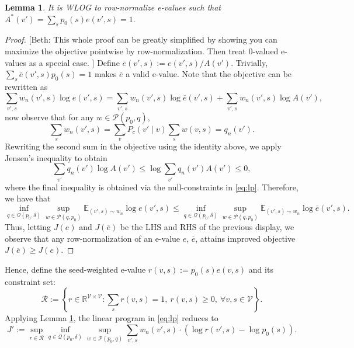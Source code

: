\documentclass[12pt]{article}
\theoremstyle{plain}
\newtheorem{lemma}[theorem]{Lemma}
\theoremstyle{definition}
\newcommand{\emp}[1]{{\color{purple} [Beth: #1]}}
\begin{document}
\begin{lemma}\label{lem:row-normalized}
    It is WLOG to row-normalize e-values such that $A^*(v') = \sum_sp_0(s)e(v',s) = 1.$
\end{lemma}
\begin{proof}

\emp{This whole proof can be greatly simplified by showing you can maximize the objective pointwise by row-normalization. Then treat 0-valued e-values as a special case. }
    Define $\overline{e}(v',s) := e(v',s)/A(v')$. Trivially, $\sum_s\overline{e}(v',s)p_0(s) = 1$ makes $\overline{e}$ a valid e-value. Note that the objective can be rewritten as 
\[\sum_{v',s}w_n(v',s)\log e(v',s) = \sum_{v',s}w_n(v',s)\log \overline{e}(v',s) + \sum_{v',s}w_n(v',s)\log A(v'),\]
now observe that for any $w \in \mathcal{P}(p_0, q)$,
\[\sum_{s}w_n(v',s) = \sum_{v}P_c(v'\mid v)\sum_{s} w(v,s) = q_n(v').\]
Rewriting the second sum in the objective using the identity above, we apply Jensen's inequality to obtain 
\[\sum_{v'}q_n(v')\log A(v') \le \log \sum_{v'}q_n(v')A(v') \le 0,\]
where the final inequality is obtained via the null-constraints in \eqref{eq:lp}. Therefore, we have that
\[\inf_{q \in \mathcal{Q}(p_0,\delta)}\sup_{w \in \mathcal{P}(q,p_0)}\mathbb{E}_{(v',s) \sim w_n}\log e(v',s) \le \inf_{q \in \mathcal{Q}(p_0,\delta)}\sup_{w \in \mathcal{P}(q,p_0)}\mathbb{E}_{(v',s)\sim w_n}\log \overline{e}(v',s).\]
Thus, letting $J(e)$ and $J(\overline{e})$ be the LHS and RHS of the previous display, we observe that any row-normalization of an e-value $e$, $\overline{e}$, attains improved objective $J(\overline{e}) \ge J(e)$. 
\end{proof}

Hence, define the seed-weighted e-value $r(v,s) := p_0(s)e(v,s)$ and its constraint set:
\begin{equation}\label{eq:seed-e-const}
    \mathcal{R} := \left\{r \in \mathbb{R}^{\mathcal{V} \times \mathcal{V}}: \sum_s r(v,s) = 1, ~ r(v,s) \ge 0, ~ \forall v,s\in \mathcal{V}\right\}.
\end{equation}
Applying Lemma \ref{lem:row-normalized}, the linear program in \eqref{eq:lp} reduces to
\[J' := \sup_{r \in \mathcal{R}}\inf_{q \in \mathcal{Q}(p_0,\delta)}\sup_{w \in \mathcal{P}(p_0,q)}\sum_{v',s}w_n(v',s)\cdot (\log r(v',s) - \log p_0(s)). \]
\end{document}
